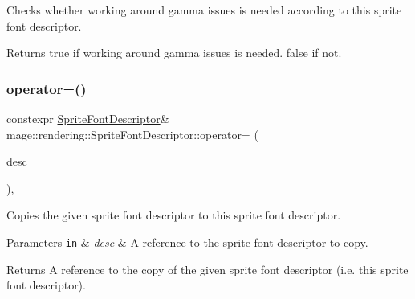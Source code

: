 Checks whether working around gamma issues is needed according to this sprite font descriptor.

\begin{DoxyReturn}{Returns}
{\ttfamily true} if working around gamma issues is needed. {\ttfamily false} if not. 
\end{DoxyReturn}
\mbox{\label{classmage_1_1rendering_1_1_sprite_font_descriptor_a41d694f929b38995aca3ccb7ee79215e}} 
\subsubsection{\texorpdfstring{operator=()}{operator=()}\hspace{0.1cm}{\footnotesize\ttfamily [1/2]}}
{\footnotesize\ttfamily constexpr \mbox{\hyperlink{classmage_1_1rendering_1_1_sprite_font_descriptor}{Sprite\+Font\+Descriptor}}\& mage\+::rendering\+::\+Sprite\+Font\+Descriptor\+::operator= (\begin{DoxyParamCaption}\item[{const \mbox{\hyperlink{classmage_1_1rendering_1_1_sprite_font_descriptor}{Sprite\+Font\+Descriptor}} \&}]{desc }\end{DoxyParamCaption})\hspace{0.3cm}{\ttfamily [default]}, {\ttfamily [noexcept]}}

Copies the given sprite font descriptor to this sprite font descriptor.


\begin{DoxyParams}[1]{Parameters}
\mbox{\tt in}  & {\em desc} & A reference to the sprite font descriptor to copy. \\
\hline
\end{DoxyParams}
\begin{DoxyReturn}{Returns}
A reference to the copy of the given sprite font descriptor (i.\+e. this sprite font descriptor). 
\end{DoxyReturn}
\mbox{\label{classmage_1_1rendering_1_1_sprite_font_descriptor_a40479c5c747c6cbcb5fdf09e6027d650}} 
